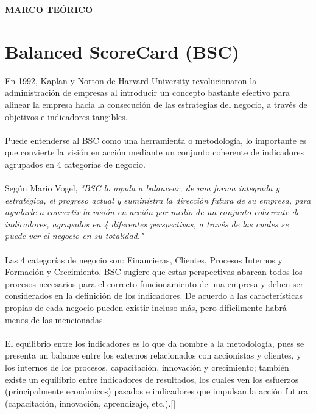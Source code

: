 \documentclass[10pt,a4paper]{article}
\begin{document}
		\vspace{\baselineskip}
		
		\begin{center}
			\textbf{MARCO TEÓRICO}
		\end{center}
			
		\section{Balanced ScoreCard (BSC)}	
		
		En 1992, Kaplan y Norton de Harvard University revolucionaron la administración de empresas al introducir un concepto bastante efectivo para alinear la empresa hacia la consecución de las estrategias del negocio, a través de objetivos e indicadores tangibles.\\
		\\		
		Puede entenderse al BSC como una herramienta o metodología, lo importante es que convierte la visión en acción mediante un conjunto coherente de indicadores agrupados en 4 categorías de negocio.\\
		\\
		Según Mario Vogel, \textit{"BSC lo ayuda a balancear, de una forma integrada y estratégica, el progreso actual y suministra la dirección futura de su empresa, para ayudarle a convertir la visión en acción por medio de un conjunto coherente de indicadores, agrupados en 4 diferentes perspectivas, a través de las cuales se puede ver el negocio en su totalidad."}\\
		\\
		Las 4 categorías de negocio son: Financieras, Clientes, Procesos Internos y Formación y Crecimiento. BSC sugiere que estas perspectivas abarcan todos los procesos necesarios para el correcto funcionamiento de una empresa y deben ser considerados en la definición de los indicadores. De acuerdo a las características propias de cada negocio pueden existir incluso más, pero difícilmente habrá menos de las mencionadas.\\
		\\
		El equilibrio entre los indicadores es lo que da nombre a la metodología, pues se presenta un balance entre los externos relacionados con accionistas y clientes, y los internos de los procesos, capacitación, innovación y crecimiento; también existe un equilibrio entre indicadores de resultados, los cuales ven los esfuerzos (principalmente económicos) pasados e indicadores que impulsan la acción futura (capacitación, innovación, aprendizaje, etc.).[\cite{herrera2015modelo}]
		
\end{document}

